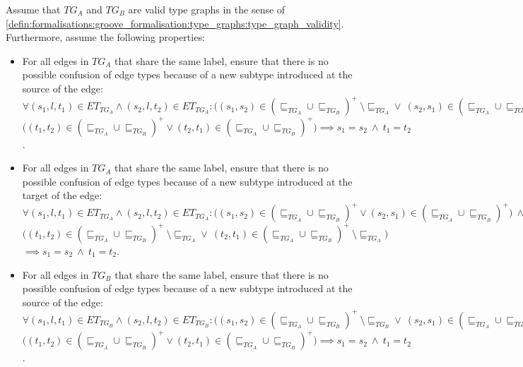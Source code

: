 \begin{thm}
\label{defin:transformation_framework:type_models_and_type_graphs:combining_type_graphs:tg_combine_correct}
Assume that $TG_A$ and $TG_B$ are valid type graphs in the sense of \cref{defin:formalisations:groove_formalisation:type_graphs:type_graph_validity}. Furthermore, assume the following properties:
\begin{itemize}
    \item For all edges in $TG_A$ that share the same label, ensure that there is no possible confusion of edge types because of a new subtype introduced at the source of the edge: $\forall (s_1, l, t_1) \in ET_{TG_A} \land (s_2, l, t_2) \in ET_{TG_A}\!: \big((s_1, s_2) \in (\sqsubseteq_{TG_A} \cup \sqsubseteq_{TG_B})^+\ \setminus \sqsubseteq_{TG_{A}}\!\! \lor\ (s_2, s_1) \in (\sqsubseteq_{TG_A} \cup \sqsubseteq_{TG_B}\!)^+\ \setminus \sqsubseteq_{TG_{A}}\!\!\big)\ \land$\\$\big((t_1, t_2) \in (\sqsubseteq_{TG_A} \cup \sqsubseteq_{TG_B})^+ \lor (t_2, t_1) \in (\sqsubseteq_{TG_A} \cup \sqsubseteq_{TG_B})^+\big) \implies s_1 = s_2\ \land\ t_1 = t_2$.
    \item For all edges in $TG_A$ that share the same label, ensure that there is no possible confusion of edge types because of a new subtype introduced at the target of the edge: $\forall (s_1, l, t_1) \in ET_{TG_A} \land (s_2, l, t_2) \in ET_{TG_A}\!: \big((s_1, s_2) \in (\sqsubseteq_{TG_A} \cup \sqsubseteq_{TG_B})^+ \lor (s_2, s_1) \in (\sqsubseteq_{TG_A} \cup \sqsubseteq_{TG_B})^+\big)\ \land$\\$\big((t_1, t_2) \in (\sqsubseteq_{TG_A} \cup \sqsubseteq_{TG_B})^+\ \setminus \sqsubseteq_{TG_{A}}\!\! \lor\ (t_2, t_1) \in (\sqsubseteq_{TG_A} \cup \sqsubseteq_{TG_B})^+\ \setminus \sqsubseteq_{TG_{A}}\!\!\big)$\\$\implies s_1 = s_2\ \land\ t_1 = t_2$.
    \item For all edges in $TG_B$ that share the same label, ensure that there is no possible confusion of edge types because of a new subtype introduced at the source of the edge: $\forall (s_1, l, t_1) \in ET_{TG_B} \land (s_2, l, t_2) \in ET_{TG_B}\!: \big((s_1, s_2) \in (\sqsubseteq_{TG_A} \cup \sqsubseteq_{TG_B})^+\ \setminus \sqsubseteq_{TG_{B}}\!\! \lor\ (s_2, s_1) \in (\sqsubseteq_{TG_A} \cup \sqsubseteq_{TG_B})^+\ \setminus \sqsubseteq_{TG_{B}}\!\!\big)\ \land$\\$\big((t_1, t_2) \in (\sqsubseteq_{TG_A} \cup \sqsubseteq_{TG_B})^+ \lor (t_2, t_1) \in (\sqsubseteq_{TG_A} \cup \sqsubseteq_{TG_B})^+\big) \implies s_1 = s_2\ \land\ t_1 = t_2$.

\end{itemize}
\end{thm}
